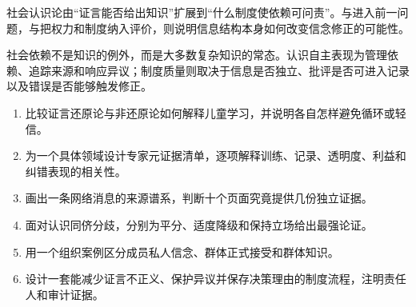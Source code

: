 社会认识论由“证言能否给出知识”扩展到“什么制度使依赖可问责”。\textcite{coady1992}与\textcite{goldberg2010}进入前一问题，\textcite{medina2013}与\textcite{anderson2012}把权力和制度纳入评价，\textcite{nguyen2020}则说明信息结构本身如何改变信念修正的可能性。

\begin{checkpoint}
社会依赖不是知识的例外，而是大多数复杂知识的常态。认识自主表现为管理依赖、追踪来源和响应异议；制度质量则取决于信息是否独立、批评是否可进入记录以及错误是否能够触发修正。
\end{checkpoint}

\begin{exercises}
\begin{enumerate}
  \item 比较证言还原论与非还原论如何解释儿童学习，并说明各自怎样避免循环或轻信。
  \item 为一个具体领域设计专家元证据清单，逐项解释训练、记录、透明度、利益和纠错表现的相关性。
  \item 画出一条网络消息的来源谱系，判断十个页面究竟提供几份独立证据。
  \item 面对认识同侪分歧，分别为平分、适度降级和保持立场给出最强论证。
  \item 用一个组织案例区分成员私人信念、群体正式接受和群体知识。
  \item 设计一套能减少证言不正义、保护异议并保存决策理由的制度流程，注明责任人和审计证据。
\end{enumerate}
\end{exercises}

\clearpage
\begin{readingmap}
\end{readingmap}
